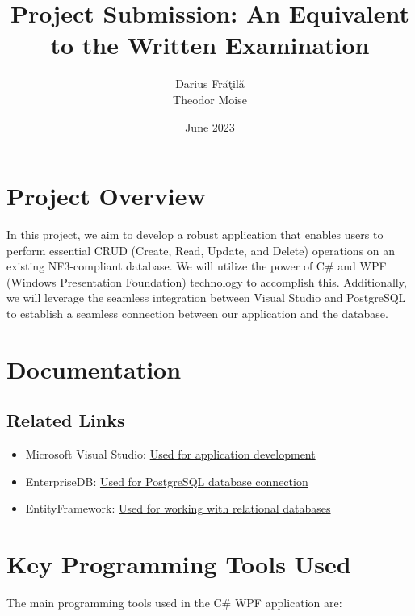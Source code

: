 \documentclass{article}
\title{Project Submission: An Equivalent to the Written Examination}
\author{
  Darius Fr\u{a}\c{t}il\u{a}\\
  Theodor Moise
}
\date{June 2023}
\begin{document}
\maketitle

\section{Project Overview}
In this project, we aim to develop a robust application that enables users to perform essential CRUD (Create, Read, Update, and Delete) operations on an existing NF3-compliant database. We will utilize the power of C\# and WPF (Windows Presentation Foundation) technology to accomplish this. Additionally, we will leverage the seamless integration between Visual Studio and PostgreSQL to establish a seamless connection between our application and the database.

\vspace{10pt}

\section{Documentation}
\subsection{Related Links}
\begin{itemize}
    \item Microsoft Visual Studio: \href{https://learn.microsoft.com/en-us/visualstudio/get-started/csharp/tutorial-wpf?view=vs-2022}{Used for application development}
    \item EnterpriseDB: \href{https://www.enterprisedb.com/postgres-tutorials/how-connect-postgresql-using-sql-developer-visual-studio-and-dbeaver}{Used for PostgreSQL database connection}
    \item EntityFramework: \href{https://learn.microsoft.com/en-us/visualstudio/data-tools/create-a-simple-data-application-with-wpf-and-entity-framework-6?view=vs-2022}{Used for working with relational databases}
\end{itemize}

\vspace{10pt}

\section{Key Programming Tools Used}
The main programming tools used in the C\# WPF application are:
\end{document}
